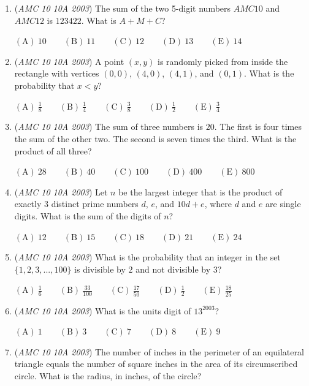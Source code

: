 \begin{enumerate}
	\item (\textit{AMC 10 10A 2003}) The sum of the two 5-digit numbers $AMC10$ and $AMC12$ is $123422$. What is $A+M+C$? 


 $\mathrm{(A) \ } 10\qquad \mathrm{(B) \ } 11\qquad \mathrm{(C) \ } 12\qquad \mathrm{(D) \ } 13\qquad \mathrm{(E) \ } 14$


	\item (\textit{AMC 10 10A 2003}) A point $(x,y)$ is randomly picked from inside the rectangle with  vertices $(0,0)$, $(4,0)$, $(4,1)$, and $(0,1)$. What is the probability that $x<y$? 


 $\mathrm{(A) \ } \frac{1}{8}\qquad \mathrm{(B) \ } \frac{1}{4}\qquad \mathrm{(C) \ } \frac{3}{8}\qquad \mathrm{(D) \ } \frac{1}{2}\qquad \mathrm{(E) \ } \frac{3}{4}$


	\item (\textit{AMC 10 10A 2003}) The sum of three numbers is $20$. The first is four times the sum of the other two. The second is seven times the third. What is the product of all three? 


 $\mathrm{(A) \ } 28\qquad \mathrm{(B) \ } 40\qquad \mathrm{(C) \ } 100\qquad \mathrm{(D) \ } 400\qquad \mathrm{(E) \ } 800$


	\item (\textit{AMC 10 10A 2003}) Let $n$ be the largest integer that is the product of exactly 3 distinct prime numbers $d$, $e$, and $10d+e$, where $d$ and $e$ are single digits. What is the sum of the digits of $n$?


 $\mathrm{(A) \ } 12\qquad \mathrm{(B) \ } 15\qquad \mathrm{(C) \ } 18\qquad \mathrm{(D) \ } 21\qquad \mathrm{(E) \ } 24$


	\item (\textit{AMC 10 10A 2003}) What is the probability that an integer in the set $\{1,2,3,...,100\}$ is divisible by $2$ and not divisible by $3$? 


 $\mathrm{(A) \ } \frac{1}{6}\qquad \mathrm{(B) \ }  \frac{33}{100}\qquad \mathrm{(C) \ }  \frac{17}{50}\qquad \mathrm{(D) \ }  \frac{1}{2}\qquad \mathrm{(E) \ }  \frac{18}{25}$


	\item (\textit{AMC 10 10A 2003}) What is the units digit of $13^{2003}$?


 $\mathrm{(A) \ } 1\qquad \mathrm{(B) \ } 3\qquad \mathrm{(C) \ } 7\qquad \mathrm{(D) \ } 8\qquad \mathrm{(E) \ } 9$


	\item (\textit{AMC 10 10A 2003}) The number of inches in the perimeter of an equilateral triangle equals the number of square inches in the area of  its circumscribed circle. What is the radius, in inches, of the circle? 



\end{enumerate}
